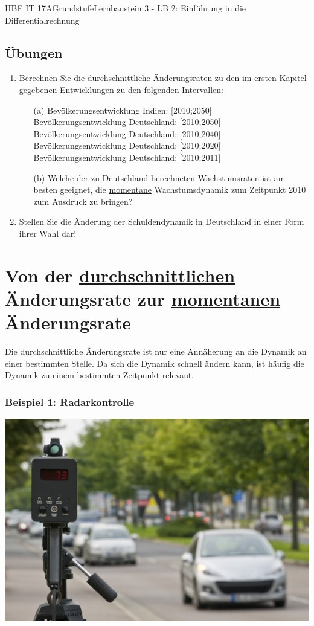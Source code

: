 \documentclass[11pt,twocolumn,oneside,openany,headings=optiontotoc,11pt,numbers=noenddot,final]{article}
\begin{document}
\begin{worksheet}{HBF IT 17A}{Grundstufe}{Lernbaustein 3 - LB 2: Einführung in die Differentialrechnung}
		\subsection{Übungen}
		\begin{enumerate}
			\item Berechnen Sie die durchschnittliche Änderungsraten zu den im ersten Kapitel gegebenen Entwicklungen zu den folgenden Intervallen:
			\begin{itemize}
				\item[(a)] Bevölkerungsentwicklung Indien: [2010;2050]\\
				Bevölkerungsentwicklung Deutschland: [2010;2050]\\
				Bevölkerungsentwicklung Deutschland: [2010;2040]\\
				Bevölkerungsentwicklung Deutschland: [2010;2020]\\
				Bevölkerungsentwicklung Deutschland: [2010;2011]\\
				\item[(b)] Welche der zu Deutschland berechneten Wachstumsraten ist am besten geeignet, die \underline{momentane} Wachstumsdynamik zum Zeitpunkt 2010 zum Ausdruck zu bringen?
			\end{itemize}
			\item Stellen Sie die Änderung der Schuldendynamik in Deutschland in einer Form ihrer Wahl dar!
		\end{enumerate}
		\section{Von der \underline{durchschnittlichen} Änderungsrate zur \underline{momentanen} Änderungsrate}
		Die durchschnittliche Änderungsrate ist nur eine Annäherung an die Dynamik an einer bestimmten Stelle. Da sich die Dynamik schnell ändern kann, ist häufig die Dynamik zu einem bestimmten Zeit\underline{punkt} relevant.
		\subsubsection*{Beispiel 1: Radarkontrolle}
		\includegraphics[scale=0.6]{Bilder/radar.jpg}

\end{worksheet}
\end{document}
